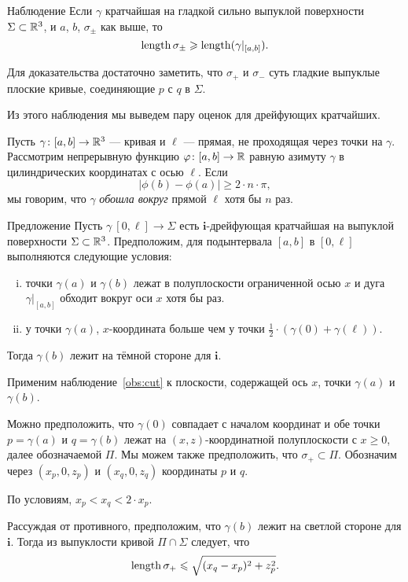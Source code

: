 \documentclass[a4paper,10pt]{article}
\begin{document}
\begin{thm}{Наблюдение}\label{obs:cut}
Если $\gamma$ кратчайшая на гладкой сильно выпуклой поверхности $\Sigma\subset \mathbb{R}^3$, и $a$, $b$, $\sigma_\pm$ как выше, то
\[\mathop{\rm length}\nolimits\sigma_\pm\geqslant\mathop{\rm length}\nolimits(\gamma|_{[a,b]}).\]
\end{thm}

Для доказательства достаточно заметить, что $\sigma_{+}$ и $\sigma_{-}$  суть гладкие выпуклые плоские кривые, 
соединяющие $p$ с $q$ в $\Sigma$.

Из этого наблюдения мы выведем пару оценок для дрейфующих кратчайших.

Пусть $\gamma\colon[a,b]\to\mathbb{R}^3$ --- кривая и $\ell$ --- прямая, не проходящая через точки на $\gamma$.
Рассмотрим непрерывную функцию $\varphi\colon[a,b]\to\mathbb{R}$ равную азимуту $\gamma$ в цилиндрических координатах с осью $\ell$.
Если
\[|\phi(b)-\phi(a)|\ge 2\cdot n\cdot\pi,\]
мы говорим, что  $\gamma$ \emph{обошла вокруг} прямой $\ell$ хотя бы $n$ раз.

\begin{thm}{Предложение}\label{prop:around-once}
Пусть $\gamma\:[0,\ell]\to \Sigma$ есть $\bm{i}$-дрейфующая кратчайшая на выпуклой поверхности $\Sigma\subset \mathbb{R}^3$. Предположим, для подынтервала $[a,b]$ в $[0,\ell]$ выполняются следующие условия:
\begin{enumerate}[(i)]
\item точки $\gamma(a)$ и $\gamma(b)$ лежат в полуплоскости ограниченной осью $x$ 
и дуга $\gamma|_{[a,b]}$ обходит вокруг оси $x$ хотя бы раз.
\item  у точки $\gamma(a)$, $x$-координата больше чем у точки $\tfrac12\cdot(\gamma(0)+\gamma(\ell))$.
\end{enumerate}
Тогда  $\gamma(b)$ лежит на тёмной стороне для $\bm{i}$.
\end{thm}

Применим наблюдение~\ref{obs:cut} к плоскости, содержащей ось $x$, точки $\gamma(a)$ и $\gamma(b)$.


Можно предположить, что $\gamma(0)$ совпадает с началом координат 
и обе точки $p=\gamma(a)$ и $q=\gamma(b)$ лежат на $(x,z)$-координатной полуплоскости с $x\ge 0$, далее обозначаемой $\Pi$.
Мы можем также предположить, что $\sigma_+\subset \Pi$.
Обозначим через $(x_p,0,z_p)$ и $(x_q,0,z_q)$ координаты $p$ и $q$.

По условиям, $x_p<x_q<2\cdot x_p$.

Рассуждая от противного, предположим, что $\gamma(b)$ лежит на светлой стороне для $\bm{i}$.
Тогда из выпуклости кривой $\Pi\cap \Sigma$
следует, что 
\[\mathop{\rm length}\nolimits\sigma_+\leqslant \sqrt{(x_q-x_p)^2+z_p^2}.\]
\end{document}
